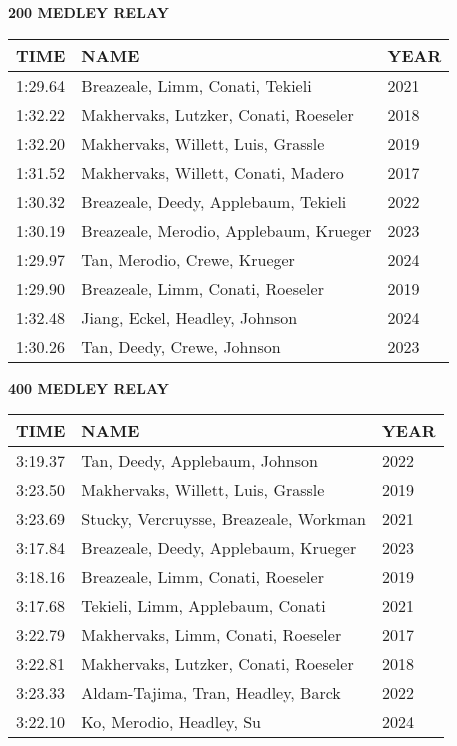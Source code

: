 \vspace{0.4cm}

\begin{center}
\begin{minipage}[t]{0.7\textwidth}
\centering
\textbf{200 MEDLEY RELAY}\\[0.05cm]
\begin{tabular}{@{}p{1.8cm}p{2.8cm}p{1.2cm}@{}}
\hline
\textbf{TIME} & \textbf{NAME} & \textbf{YEAR} \\
\hline
1:29.64 & Breazeale, Limm, Conati, Tekieli & 2021 \\
1:32.22 & Makhervaks, Lutzker, Conati, Roeseler & 2018 \\
1:32.20 & Makhervaks, Willett, Luis, Grassle & 2019 \\
1:31.52 & Makhervaks, Willett, Conati, Madero & 2017 \\
1:30.32 & Breazeale, Deedy, Applebaum, Tekieli & 2022 \\
1:30.19 & Breazeale, Merodio, Applebaum, Krueger & 2023 \\
1:29.97 & Tan, Merodio, Crewe, Krueger & 2024 \\
1:29.90 & Breazeale, Limm, Conati, Roeseler & 2019 \\
1:32.48 & Jiang, Eckel, Headley, Johnson & 2024 \\
1:30.26 & Tan, Deedy, Crewe, Johnson & 2023 \\
\hline
\end{tabular}
\end{minipage}
\end{center}

\vspace{0.4cm}

\begin{center}
\begin{minipage}[t]{0.7\textwidth}
\centering
\textbf{400 MEDLEY RELAY}\\[0.05cm]
\begin{tabular}{@{}p{1.8cm}p{2.8cm}p{1.2cm}@{}}
\hline
\textbf{TIME} & \textbf{NAME} & \textbf{YEAR} \\
\hline
3:19.37 & Tan, Deedy, Applebaum, Johnson & 2022 \\
3:23.50 & Makhervaks, Willett, Luis, Grassle & 2019 \\
3:23.69 & Stucky, Vercruysse, Breazeale, Workman & 2021 \\
3:17.84 & Breazeale, Deedy, Applebaum, Krueger & 2023 \\
3:18.16 & Breazeale, Limm, Conati, Roeseler & 2019 \\
3:17.68 & Tekieli, Limm, Applebaum, Conati & 2021 \\
3:22.79 & Makhervaks, Limm, Conati, Roeseler & 2017 \\
3:22.81 & Makhervaks, Lutzker, Conati, Roeseler & 2018 \\
3:23.33 & Aldam-Tajima, Tran, Headley, Barck & 2022 \\
3:22.10 & Ko, Merodio, Headley, Su & 2024 \\
\hline
\end{tabular}
\end{minipage}
\end{center}

